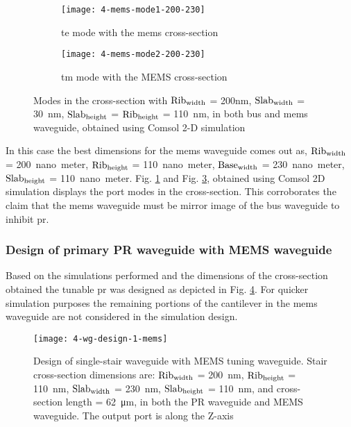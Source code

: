 \documentclass[../report.tex]{subfiles}
\begin{document}
\begin{figure}[H] %
	\begin{subfigure}[t]{0.45\textwidth}
		\texttt{[image: 4-mems-mode1-200-230]}
		\caption{\gls{te} mode with the \gls{mems} cross-section}
		\label{fig:4_mems_mode1_200_230}
	\end{subfigure}
	\hfill
	\begin{subfigure}[t]{0.45\textwidth}
		\texttt{[image: 4-mems-mode2-200-230]}
		\caption{\gls{tm} mode with the MEMS cross-section}
		\label{fig:4_mems_mode2_200_230}
	\end{subfigure}
	\caption{Modes in the cross-section with $\mathrm{Rib_{width}}$ = 200nm, $\mathrm{Slab_{width}}$ = \SI{30}{\nano \meter}, $\mathrm{Slab_{height}}$ = $\mathrm{Rib_{height}}$ = \SI{110}{\nano \meter}, in both bus and \gls{mems} waveguide, obtained using Comsol 2-D simulation}
\end{figure}

In this case the best dimensions for the \gls{mems} waveguide comes out as, $\mathrm{Rib_{width}}$ = \SI{200}{nano meter}, $\mathrm{Rib_{height}}$ = \SI{110}{nano meter}, $\mathrm{Base_{width}}$ = \SI{230}{nano meter}, $\mathrm{Slab_{height}}$ = \SI{110}{nano meter}. Fig. \ref{fig:4_mems_mode1_200_230} and Fig. \ref{fig:4_mems_mode2_200_230}, obtained using Comsol 2D simulation displays the port modes in the cross-section. This corroborates the claim that the \gls{mems} waveguide must be mirror image of the bus waveguide to inhibit \gls{pr}.

\subsubsection{Design of primary PR waveguide with MEMS waveguide}			
Based on the simulations performed and the dimensions of the cross-section obtained the tunable \gls{pr} was designed as depicted in Fig. \ref{fig:4_wg_design_1_mems}. For quicker simulation purposes the remaining portions of the cantilever in the \gls{mems} waveguide are not considered in the simulation design.  

\begin{figure}[H] %
	\centering
	\texttt{[image: 4-wg-design-1-mems]}
	\caption{Design of single-stair waveguide with MEMS tuning waveguide. Stair cross-section dimensions are: $\mathrm{Rib_{width}}$ = \SI{200}{\nano \meter}, $\mathrm{Rib_{height}}$ = \SI{110}{\nano \meter}, $\mathrm{Slab_{width}}$ = \SI{230}{\nano \meter}, $\mathrm{Slab_{height}}$ = \SI{110}{\nano \meter}, and cross-section length = \SI{62}{\micro\meter}, in both the PR waveguide and MEMS waveguide. The output port is along the Z-axis}
	\label{fig:4_wg_design_1_mems}
\end{figure}
\end{document}
